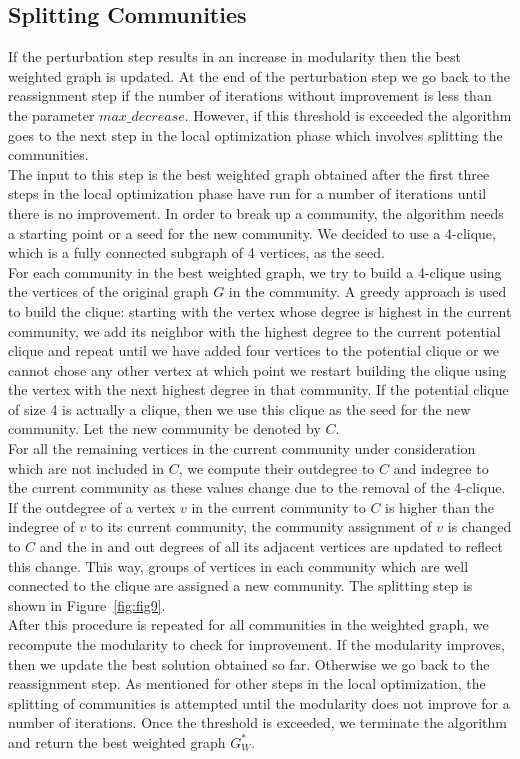 \begin{spacing}{1.5}
\subsection{Splitting Communities}
\indent If the perturbation step results in an increase in modularity then the best weighted graph is updated. At the end of the perturbation step we go back to the reassignment step if the number of iterations without improvement is less than the parameter $max\_decrease$. However, if this threshold is exceeded the algorithm goes to the next step in the local optimization phase which involves splitting the communities. \\
\indent The input to this step is the best weighted graph obtained after the first three steps in the local optimization phase have run for a number of iterations until there is no improvement. In order to break up a community, the algorithm needs a starting point or a seed for the new community. We decided to use a 4-clique, which is a fully connected subgraph of 4 vertices, as the seed.\\
\indent For each community in the best weighted graph, we try to build a 4-clique using the vertices of the original graph $G$ in the community. A greedy approach is used to build the clique: starting with the vertex whose degree is highest in the current community, we add its neighbor with the highest degree to the current potential clique and repeat until we have added four vertices to the potential clique or we cannot chose any other vertex at which point we restart building the clique using the vertex with the next highest degree in that community. If the potential clique of size 4 is actually a clique, then we use this clique as the seed for the new community. Let the new community be denoted by $C$.\\
\indent For all the remaining vertices in the current community under consideration which are not included in $C$, we compute their outdegree to $C$ and indegree to the current community as these values change due to the removal of the 4-clique. If the outdegree of a vertex $v$ in the current community to $C$ is higher than the indegree of $v$ to its current community, the community assignment of $v$ is changed to $C$ and the in and out degrees of all its adjacent vertices are updated to reflect this change. This way, groups of vertices in each community which are well connected to the clique are assigned a new community. The splitting step is shown in Figure~\ref{fig:fig9}. \\
\indent After this procedure is repeated for all communities in the weighted graph, we recompute the modularity to check for improvement. If the modularity improves, then we update the best solution obtained so far. Otherwise we go back to the reassignment step. As mentioned for other steps in the local optimization, the splitting of communities is attempted until the modularity does not improve for a number of iterations. Once the threshold is exceeded, we terminate the algorithm and return the best weighted graph $G_W^*$.


\end{spacing}
